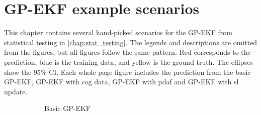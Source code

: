\chapter{GP-EKF example scenarios}\label{chap:gp_ekf_examples}
This chapter contains several hand-picked scenarios for the GP-EKF from statistical testing in \cref{chap:stat_testing}.
The legends and descriptions are omitted from the figures, but all figures follow the same pattern. Red corresponds to the prediction, blue is the training data, and yellow is the ground truth. The ellipses show the $95\%$ CI. Each whole page figure includes the prediction from the basic GP-EKF, GP-EKF with \acrshort{cog} data, GP-EKF with \acrshort{pdaf} and GP-EKF with \acrshort{sl} update.

\begin{figure}
    \begin{subfigure}{\textwidth}
        \caption{Basic GP-EKF}
    \end{subfigure}
    \begin{subfigure}{\textwidth}


\end{subfigure}
\end{figure}
